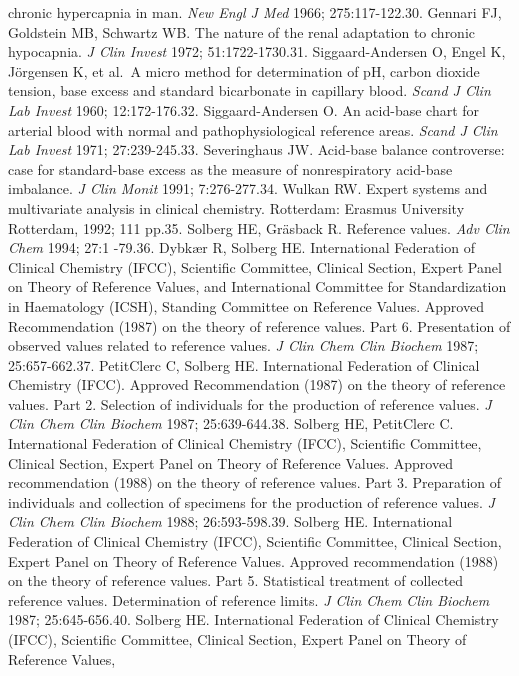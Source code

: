 \documentclass[
  12pt,
  a4paperpaper,
]{report}
\begin{document}
chronic hypercapnia in man. \emph{New Engl J Med} 1966; 275:117-122.30.
Gennari FJ, Goldstein MB, Schwartz WB. The nature of the renal
adaptation to chronic hypocapnia. \emph{J Clin Invest} 1972;
51:1722-1730.31. Siggaard-Andersen O, Engel K, Jörgensen K, et al.~A
micro method for determination of pH, carbon dioxide tension, base
excess and standard bicarbonate in capillary blood. \emph{Scand J Clin
Lab Invest} 1960; 12:172-176.32. Siggaard-Andersen O. An acid-base chart
for arterial blood with normal and pathophysiological reference areas.
\emph{Scand J Clin Lab Invest} 1971; 27:239-245.33. Severinghaus JW.
Acid-base balance controverse: case for standard-base excess as the
measure of nonrespiratory acid-base imbalance. \emph{J Clin Monit} 1991;
7:276-277.34. Wulkan RW. Expert systems and multivariate analysis in
clinical chemistry. Rotterdam: Erasmus University Rotterdam, 1992; 111
pp.35. Solberg HE, Gräsback R. Reference values. \emph{Adv Clin Chem}
1994; 27:1 -79.36. Dybkær R, Solberg HE. International Federation of
Clinical Chemistry (IFCC), Scientific Committee, Clinical Section,
Expert Panel on Theory of Reference Values, and International Committee
for Standardization in Haematology (ICSH), Standing Committee on
Reference Values. Approved Recommendation (1987) on the theory of
reference values. Part 6. Presentation of observed values related to
reference values. \emph{J Clin Chem Clin Biochem} 1987; 25:657-662.37.
PetitClerc C, Solberg HE. International Federation of Clinical Chemistry
(IFCC). Approved Recommendation (1987) on the theory of reference
values. Part 2. Selection of individuals for the production of reference
values. \emph{J Clin Chem Clin Biochem} 1987; 25:639-644.38. Solberg HE,
PetitClerc C. International Federation of Clinical Chemistry (IFCC),
Scientific Committee, Clinical Section, Expert Panel on Theory of
Reference Values. Approved recommendation (1988) on the theory of
reference values. Part 3. Preparation of individuals and collection of
specimens for the production of reference values. \emph{J Clin Chem Clin
Biochem} 1988; 26:593-598.39. Solberg HE. International Federation of
Clinical Chemistry (IFCC), Scientific Committee, Clinical Section,
Expert Panel on Theory of Reference Values. Approved recommendation
(1988) on the theory of reference values. Part 5. Statistical treatment
of collected reference values. Determination of reference limits.
\emph{J Clin Chem Clin Biochem} 1987; 25:645-656.40. Solberg HE.
International Federation of Clinical Chemistry (IFCC), Scientific
Committee, Clinical Section, Expert Panel on Theory of Reference Values,
\end{document}
